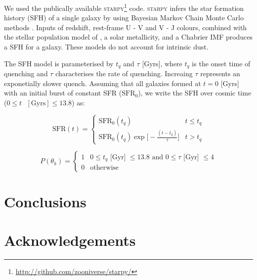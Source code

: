 \documentclass[a4paper,fleqn,usenatbib]{mnras}
\begin{document}
We used the publically available \textsc{starpy}\footnote{\url{http://github.com/zooniverse/starpy/}}
code. \textsc{starpy} infers the star formation history (SFH) of a single galaxy by using Bayesian 
Markov Chain Monte Carlo methods \citep{mackey2013}. Inputs of redshift, rest-frame U - V and V - J colours, 
combined with the stellar population model of \cite{bruzual2003}, a solar metallicity, and a Chabrier
IMF \cite{chabrier2003} produces a SFH for a galaxy. These models do not account for intrinsic dust. 

The SFH model is parameterised by $t_{q}$ and $\tau$ [Gyrs], where $t_{q}$ is the onset time of quenching
and $\tau$ characterises the rate of quenching. Increaing $\tau$ represents an exponetially slower quench. 
Assuming that all galaxies formed at $t=0$ [Gyrs] with an initial burst of constant SFR ($\text{SFR}_{0}$), 
we write the SFH over cosmic time ($0\leq t \text{ }[\text{Gyrs}]\leq 13.8$) as:

 \begin{equation}
       \text{SFR}(t) = \begin{cases}
                 \text{SFR}_{0}(t_{q}) & t \leq t_{q} \\
                 \text{SFR}_{0}(t_{q})\exp\bigg[-\frac{(t-t_{q})}{\tau}\bigg] & t > t_{q} 
                \end{cases}
        \label{eq:model}
 \end{equation}

   

   \begin{equation}
      P(\theta_{k}) = \begin{cases}
                       1 & 0\leq t_{q}\text{ [Gyr] } \leq 13.8 \text{ and }  0 \leq \tau\text{ [Gyr] } \leq 4 \\
                       0 & \text{otherwise}
                      \end{cases}
      \label{eq:prior}
   \end{equation}

\section{Conclusions}

\section*{Acknowledgements}










\appendix




\bsp	%
\label{lastpage}
\end{document}
